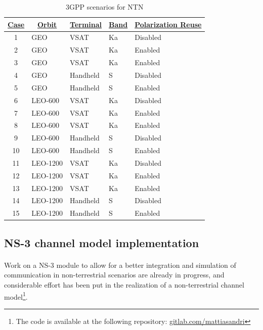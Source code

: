 \begin{table}[]
    \begin{tabular}{cllll}
    \hline
    {\ul \textbf{Case}} & \multicolumn{1}{c}{{\ul \textbf{Orbit}}} & \multicolumn{1}{c}{{\ul \textbf{Terminal}}} & \multicolumn{1}{c}{{\ul \textbf{Band}}} & \multicolumn{1}{c}{{\ul \textbf{Polarization Reuse}}} \\ \hline
    1  & GEO      & VSAT     & Ka & Disabled \\ \hline
    2  & GEO      & VSAT     & Ka & Enabled  \\ \hline
    3  & GEO      & VSAT     & Ka & Enabled  \\ \hline
    4  & GEO      & Handheld & S  & Disabled \\ \hline
    5  & GEO      & Handheld & S  & Enabled  \\ \hline
    6  & LEO-600  & VSAT     & Ka & Disabled \\ \hline
    7  & LEO-600  & VSAT     & Ka & Enabled  \\ \hline
    8  & LEO-600  & VSAT     & Ka & Enabled  \\ \hline
    9  & LEO-600  & Handheld & S  & Disabled \\ \hline
    10 & LEO-600  & Handheld & S  & Enabled  \\ \hline
    11 & LEO-1200 & VSAT     & Ka & Disabled \\ \hline
    12 & LEO-1200 & VSAT     & Ka & Enabled  \\ \hline
    13 & LEO-1200 & VSAT     & Ka & Enabled  \\ \hline
    14 & LEO-1200 & Handheld & S  & Disabled \\ \hline
    15 & LEO-1200 & Handheld & S  & Enabled  \\ \hline
    \end{tabular}
    \caption{3GPP scenarios for NTN \label{tab:scenarios}}
    \end{table}

\subsection{NS-3 channel model implementation}

\paragraph{}
Work on a NS-3 module to allow for a better integration and simulation of communication in non-terrestrial scenarios are already in progress, and considerable effort has been put in the realization of a non-terrestrial channel model\footnote{The code is available at the following repository: \href{https://gitlab.com/mattiasandri/ns-3-ntn/-/tree/ntn-dev?ref_type=heads}{gitlab.com/mattiasandri}}.

